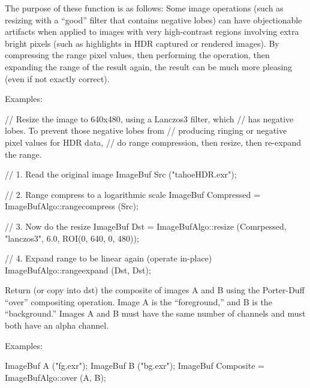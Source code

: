 The purpose of these function is as follows: Some image operations (such
as resizing with a ``good'' filter that contains negative lobes) can have
objectionable artifacts when applied to images with very high-contrast
regions involving extra bright pixels (such as highlights in HDR
captured or rendered images).  By compressing the range pixel values,
then performing the operation, then expanding the range of the result
again, the result can be much more pleasing (even if not exactly
correct).

\smallskip
\noindent Examples:
\begin{code}
    // Resize the image to 640x480, using a Lanczos3 filter, which
    // has negative lobes. To prevent those negative lobes from
    // producing ringing or negative pixel values for HDR data,
    // do range compression, then resize, then re-expand the range.

    // 1. Read the original image
    ImageBuf Src ("tahoeHDR.exr");

    // 2. Range compress to a logarithmic scale
    ImageBuf Compressed = ImageBufAlgo::rangecompress (Src);

    // 3. Now do the resize
    ImageBuf Dst = ImageBufAlgo::resize (Comrpessed, "lanczos3", 6.0,
                                         ROI(0, 640, 0, 480));

    // 4. Expand range to be linear again (operate in-place)
    ImageBufAlgo::rangeexpand (Dst, Dst);
\end{code}
\apiend


 

Return (or copy into {\cf dst}) the composite of 
images {\cf A} and {\cf B} using the Porter-Duff ``over'' compositing
operation.  Image {\cf A} is the
``foreground,'' and {\cf B} is the ``background.''  Images {\cf A} and
{\cf B} must have the same number of channels and must both have an
alpha channel.

\smallskip
\noindent Examples:
\begin{code}
    ImageBuf A ("fg.exr");
    ImageBuf B ("bg.exr");
    ImageBuf Composite = ImageBufAlgo::over (A, B);
\end{code}
\apiend


